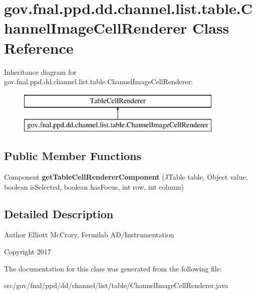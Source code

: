 \hypertarget{classgov_1_1fnal_1_1ppd_1_1dd_1_1channel_1_1list_1_1table_1_1ChannelImageCellRenderer}{\section{gov.\-fnal.\-ppd.\-dd.\-channel.\-list.\-table.\-Channel\-Image\-Cell\-Renderer Class Reference}
\label{classgov_1_1fnal_1_1ppd_1_1dd_1_1channel_1_1list_1_1table_1_1ChannelImageCellRenderer}
}
Inheritance diagram for gov.\-fnal.\-ppd.\-dd.\-channel.\-list.\-table.\-Channel\-Image\-Cell\-Renderer\-:\begin{figure}[H]
\begin{center}
\leavevmode
\includegraphics[height=2.000000cm]{classgov_1_1fnal_1_1ppd_1_1dd_1_1channel_1_1list_1_1table_1_1ChannelImageCellRenderer}
\end{center}
\end{figure}
\subsection*{Public Member Functions}
\begin{DoxyCompactItemize}
\item 
\hypertarget{classgov_1_1fnal_1_1ppd_1_1dd_1_1channel_1_1list_1_1table_1_1ChannelImageCellRenderer_a9f7de2d0208d162c90d95e071c1718b0}{Component {\bfseries get\-Table\-Cell\-Renderer\-Component} (J\-Table table, Object value, boolean is\-Selected, boolean has\-Focus, int row, int column)}\label{classgov_1_1fnal_1_1ppd_1_1dd_1_1channel_1_1list_1_1table_1_1ChannelImageCellRenderer_a9f7de2d0208d162c90d95e071c1718b0}

\end{DoxyCompactItemize}


\subsection{Detailed Description}
\begin{DoxyAuthor}{Author}
Elliott Mc\-Crory, Fermilab A\-D/\-Instrumentation 
\end{DoxyAuthor}
\begin{DoxyCopyright}{Copyright}
2017 
\end{DoxyCopyright}


The documentation for this class was generated from the following file\-:\begin{DoxyCompactItemize}
\item 
src/gov/fnal/ppd/dd/channel/list/table/Channel\-Image\-Cell\-Renderer.\-java\end{DoxyCompactItemize}
